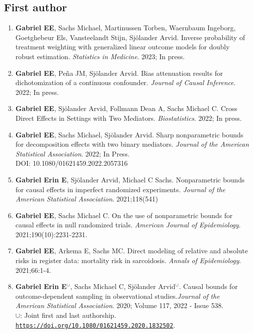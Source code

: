 \documentclass[12pt]{article}
\providecommand \url[1]{\href{#1}{#1}}
\renewcommand*\url[1]{\href{#1}{\texttt{#1}}}
\begin{document}
\subsection*{First author}
\begin{enumerate}

\item \textbf{Gabriel EE}, Sachs Michael, Martinussen Torben, Waernbaum Ingeborg, Goetghebeur Els, Vansteelandt Stijn, Sjölander Arvid. Inverse probability of treatment weighting with generalized linear outcome models for doubly robust estimation. \emph{Statistics in Medicine}. 2023; In press.

\item \textbf{Gabriel EE}, Peña JM, Sjölander Arvid. Bias attenuation results for dichotomization of a continuous confounder.  \emph{Journal of Causal Inference}. 2022; In press.

\item \textbf{Gabriel EE}, Sjölander Arvid, Follmann Dean A, Sachs Michael C. Cross Direct Effects in Settings with Two Mediators. \emph{Biostatistics}. 2022; In press.



\item \textbf{Gabriel EE}, Sachs Michael, Sjölander Arvid. Sharp nonparametric bounds for decomposition effects with two binary mediators. \emph{Journal of the American Statistical Association}. 2022; In Press.\\
DOI: 10.1080/01621459.2022.2057316


\item \textbf{Gabriel Erin E}, Sjölander Arvid, Michael C Sachs. Nonparametric bounds for causal effects in imperfect randomized experiments. \emph{Journal of the American Statistical Association}. 2021;118(541)



\item \textbf{Gabriel EE}, Sachs Michael C. On the use of nonparametric bounds for causal effects in null randomized trials. \emph{American Journal of Epidemiology}. 2021;190(10):2231-2231.


\item \textbf{Gabriel EE}, Arkema E, Sachs MC.  Direct modeling of relative and absolute risks in register data: mortality risk in sarcoidosis. \emph{Annals of Epidemiology}. 2021;66:1-4.



\item \textbf{Gabriel Erin E}$^\cup$, Sachs Michael C, Sjölander Arvid$^\cup$. Causal bounds for outcome-dependent sampling in observational studies.\emph{Journal of the American Statistical Association}. 2020; Volume 117, 2022 - Issue 538.\\
$\cup$: Joint first and last authorship.\\
\url{https://doi.org/10.1080/01621459.2020.1832502}.


\end{enumerate}
\end{document}
